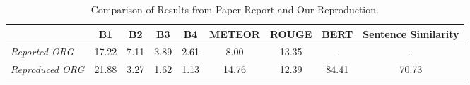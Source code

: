 \begin{table*}[ht]
    \centering
    \footnotesize{
    \begin{tabular}{@{}lcccccccc@{}}
        \toprule
        & B1    & B2    & B3    & B4    & METEOR & ROUGE & BERT & Sentence Similarity \\ 
        \midrule
        \textit{Reported ORG} & 17.22 & 7.11  & 3.89  & 2.61  & 8.00   & 13.35 & - & -        \\ 
        \textit{Reproduced ORG}   & 21.88 & 3.27  & 1.62  & 1.13  & 14.76  & 12.39 & 84.41 & 70.73 \\ 
        \bottomrule
    \end{tabular}
    }
    \caption{Comparison of Results from Paper Report and Our Reproduction.}
    \label{tab:comparison}
\end{table*}